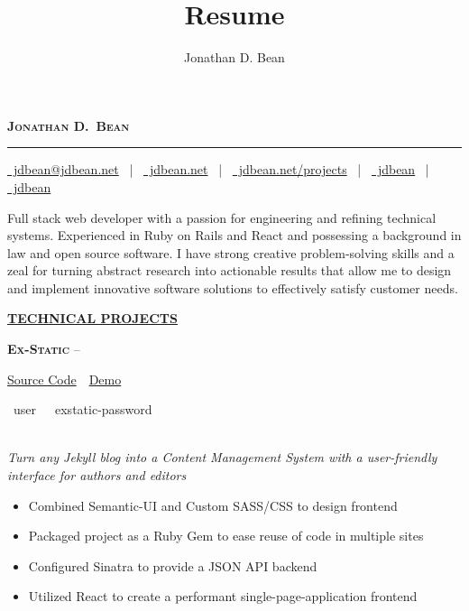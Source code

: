 \documentclass[11pt,letterpaper,english]{article}
\title{Resume}
\author{Jonathan D. Bean}
\date{}
\begin{document}
\label{Header}
\vspace*{-40pt}
\begin{singlespace}
\begin{center}
\textsc{\textbf{\LARGE Jonathan D.\ Bean}}
\vspace{3pt}
\hrule height 1pt
\vspace{4pt}
\small
\href{mailto:jdbean@jdbean.net}{\color{black}\faEnvelope~jdbean@jdbean.net}
~|~
\href{https://jdbean.net}{\color{black}\faGlobe~jdbean.net}
~|~
\href{https://jdbean.net/projects}{\color{black}\faEye~jdbean.net/projects}
~|~
\href{https://github.com/jdbean}{\color{black}\faGithub~jdbean}
~|~
\href{https://gitlab.com/jdbean}{\color{black}\faGitlab~jdbean}\\
\small
\end{center}
\end{singlespace}

\label{Description}
\vspace{-12pt}
\begin{changemargin}{0.3cm}{0.3cm}
Full stack web developer with a passion for engineering and refining technical systems. Experienced in Ruby on Rails and React and possessing a background in law and open source software. I have strong creative problem-solving skills and a zeal for turning abstract research into actionable results that allow me to design and implement innovative software solutions to effectively satisfy customer needs.
\end{changemargin}

\label{Technical Projects}
\underline{\textbf{\textsc{\large TECHNICAL PROJECTS}}}{\large \par}
\smallskip

\textbf{\textsc{Ex-Static}} 
--\begin{small}
\href{https://github.com/jdbean/Ex-Static}{Source Code}~\color{darkgray}{|}~\href{https://office.johannabearman.duckdns.org}{Demo}
\end{small}
\begin{scriptsize}
\color{gray}
\faUser~user~~\faKey~exstatic-password
\end{scriptsize}\\
\textit{Turn any Jekyll blog into a Content Management System with a user-friendly interface for authors and editors}
\begin{itemize}
\item Combined Semantic-UI and Custom SASS/CSS to design frontend
\item Packaged project as a Ruby Gem to ease reuse of code in multiple sites
\item Configured Sinatra to provide a JSON API backend
\item Utilized React to create a performant single-page-application frontend
\end{itemize}
\smallskip
\end{document}
